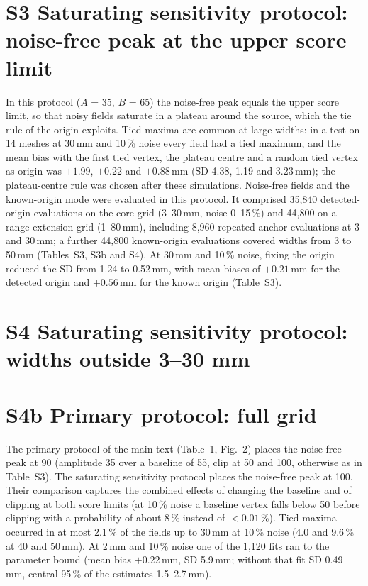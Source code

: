 \documentclass[10pt,a4paper]{article}
\renewcommand{\thetable}{S\arabic{table}}
\newcommand{\stab}[1]{\renewcommand{\thetable}{#1}}
\begin{document}
\section*{S3 Saturating sensitivity protocol: noise-free peak at the upper score limit}
In this protocol ($A$ = 35, $B$ = 65) the noise-free peak equals the upper score limit, so that noisy fields saturate in a plateau around the source, which the tie rule of the origin exploits.  Tied maxima are common at large widths: in a test on 14 meshes at 30\,mm and 10\,\% noise every field had a tied maximum, and the mean bias with the first tied vertex, the plateau centre and a random tied vertex as origin was $+1.99$, $+0.22$ and $+0.88$\,mm (SD 4.38, 1.19 and 3.23\,mm); the plateau-centre rule was chosen after these simulations.  Noise-free fields and the known-origin mode were evaluated in this protocol.  It comprised 35{,}840 detected-origin evaluations on the core grid (3--30\,mm, noise 0--15\,\%) and 44{,}800 on a range-extension grid (1--80\,mm), including 8{,}960 repeated anchor evaluations at 3 and 30\,mm; a further 44{,}800 known-origin evaluations covered widths from 3 to 50\,mm (Tables~S3, S3b and S4).  At 30\,mm and 10\,\% noise, fixing the origin reduced the SD from 1.24 to 0.52\,mm, with mean biases of $+0.21$\,mm for the detected origin and $+0.56$\,mm for the known origin (Table~S3).
\stab{S3}
\stab{S3b}

\section*{S4 Saturating sensitivity protocol: widths outside 3--30 mm}
\stab{S4}

\section*{S4b Primary protocol: full grid}
The primary protocol of the main text (Table~1, Fig.~2) places the noise-free peak at 90 (amplitude 35 over a baseline of 55, clip at 50 and 100, otherwise as in Table~S3).  The saturating sensitivity protocol places the noise-free peak at 100.  Their comparison captures the combined effects of changing the baseline and of clipping at both score limits (at 10\,\% noise a baseline vertex falls below 50 before clipping with a probability of about 8\,\% instead of $<0.01$\,\%).  Tied maxima occurred in at most 2.1\,\% of the fields up to 30\,mm at 10\,\% noise (4.0 and 9.6\,\% at 40 and 50\,mm).  At 2\,mm and 10\,\% noise one of the 1{,}120 fits ran to the parameter bound (mean bias $+0.22$\,mm, SD 5.9\,mm; without that fit SD 0.49\,mm, central 95\,\% of the estimates 1.5--2.7\,mm).
\stab{S4b}
\end{document}
